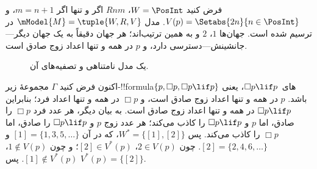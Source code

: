 \documentclass[../../../include/open-logic-section]{subfiles}
\begin{document}
\begin{ex}
  فرض کنید $W = \PosInt$، $Rnm$ اگر و تنها اگر $m = n + 1$، و
  $V(p) = \Setabs{2n}{n \in \PosInt}$. مدل
  $\mModel{M} = \tuple{W, R, V}$ در  ترسیم
  شده است. جهان‌ها $1$، $2$ و به همین ترتیب‌اند؛ هر جهان دقیقاً به یک
  جهان دیگر---جانشینش---دسترسی دارد، و $p$ در همه و تنها اعداد زوج
  صادق است.

  \begin{figure}
    \centering

    \caption{یک مدل نامتناهی و تصفیه‌های آن.}
  \end{figure}
  
  اکنون فرض کنید $\Gamma$ مجموعهٔ زیر-!!{formula}های~$\Box p \lif p$،
  یعنی $\{p, \Box p, \Box p \lif p\}$ باشد. $p$ در همه و تنها اعداد
  زوج صادق است، و $\Box p$ در همه و تنها اعداد فرد؛ بنابراین
  $\Box p \lif p$ در همه و تنها اعداد زوج صادق است. به بیان دیگر، هر
  عدد فرد $\Box p$ را صادق، اما $p$ و $\Box p \lif p$ را کاذب می‌کند؛
  هر عدد زوج $p$ و $\Box p \lif p$ را صادق، اما $\Box p$ را کاذب
  می‌کند. پس $W^* = \{ [1], [2] \}$، که در آن $[1] =
  \{1, 3, 5, \dots\}$ و $[2] = \{2, 4, 6, \dots\}$. چون $2 \in
  V(p)$، $[2] \in V^*(p)$؛ و چون $1 \notin V(p)$، $[1] \notin
  V^*(p)$. پس $V^*(p) = \{[2]\}$.


\end{ex}
\end{document}
